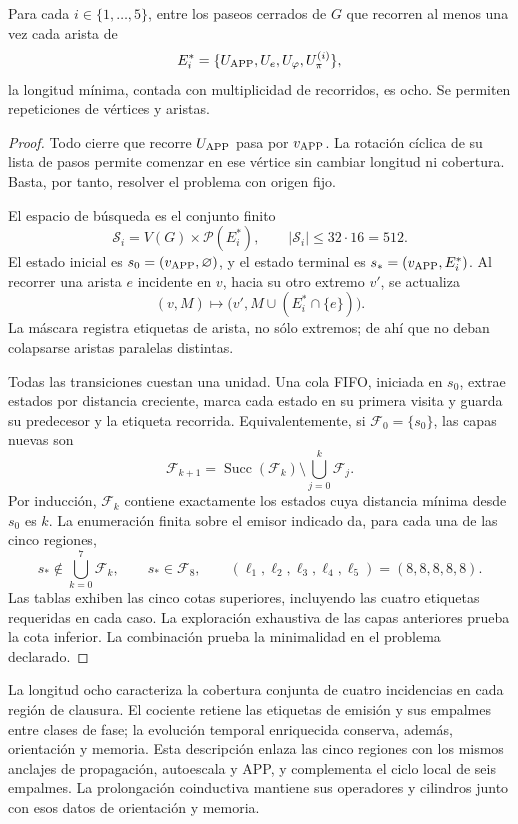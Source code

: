 \begin{theorem}
\label{regcl27:minimalidad}
Para cada \(i\in\{1,\ldots,5\}\), entre los paseos cerrados de \(G\)
que recorren al menos una vez cada arista de
\[
 E_i^*=\{U_{\rm APP},U_e,U_\varphi,U_\pi^{(i)}\},
\]
la longitud mínima, contada con multiplicidad de recorridos, es ocho.
Se permiten repeticiones de vértices y aristas.
\end{theorem}

\begin{proof}
Todo cierre que recorre \(U_{\rm APP}\) pasa por \(v_{\rm APP}\).
La rotación cíclica de su lista de pasos permite comenzar en ese vértice
sin cambiar longitud ni cobertura. Basta, por tanto, resolver el problema
con origen fijo.

El espacio de búsqueda es el conjunto finito
\[
 \mathscr S_i=V(G)\times\mathcal P(E_i^*),
 \qquad |\mathscr S_i|\le32\cdot16=512.
\]
El estado inicial es \(s_0=(v_{\rm APP},\varnothing)\), y el estado
terminal es \(s_*=(v_{\rm APP},E_i^*)\). Al recorrer una arista \(e\)
incidente en \(v\), hacia su otro extremo \(v'\), se actualiza
\begin{equation}
 (v,M)\longmapsto\bigl(v',M\cup(E_i^*\cap\{e\})\bigr).
 \label{regcl27:transicion-bfs}
\end{equation}
La máscara registra etiquetas de arista, no sólo extremos; de ahí que
no deban colapsarse aristas paralelas distintas.

Todas las transiciones cuestan una unidad. Una cola FIFO, iniciada en
\(s_0\), extrae estados por distancia creciente, marca cada estado en
su primera visita y guarda su predecesor y la etiqueta recorrida.
Equivalentemente, si \(\mathcal F_0=\{s_0\}\), las capas nuevas son
\[
 \mathcal F_{k+1}
 =\operatorname{Succ}(\mathcal F_k)
   \setminus\bigcup_{j=0}^{k}\mathcal F_j.
\]
Por inducción, \(\mathcal F_k\) contiene exactamente los estados cuya
distancia mínima desde \(s_0\) es \(k\). La enumeración finita sobre el
emisor indicado da, para cada una de las cinco regiones,
\[
 s_*\notin\bigcup_{k=0}^{7}\mathcal F_k,\qquad s_*\in\mathcal F_8,
 \qquad (\ell_1,\ell_2,\ell_3,\ell_4,\ell_5)=(8,8,8,8,8).
\]
Las tablas exhiben las cinco cotas superiores, incluyendo las cuatro
etiquetas requeridas en cada caso. La exploración exhaustiva de las
capas anteriores prueba la cota inferior. La combinación prueba la
minimalidad en el problema declarado.
\end{proof}

La longitud ocho caracteriza la cobertura conjunta de cuatro incidencias
en cada región de clausura. El cociente retiene las etiquetas de emisión
y sus empalmes entre clases de fase; la evolución temporal enriquecida
conserva, además, orientación y memoria. Esta descripción enlaza las cinco
regiones con los mismos anclajes de propagación, autoescala y APP, y
complementa el ciclo local de seis empalmes. La prolongación coinductiva
mantiene sus operadores y cilindros junto con esos datos de orientación
y memoria.
